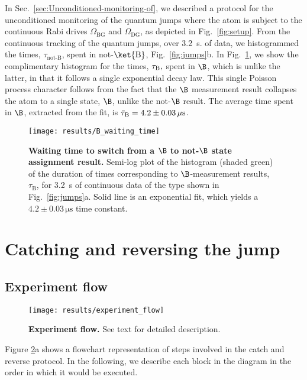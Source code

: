 In Sec.~\ref{sec:Unconditioned-monitoring-of}, we described a protocol
for the unconditioned monitoring of the quantum jumps where the atom
is subject to the continuous Rabi drives $\Omega_{\mathrm{BG}}$ and
$\Omega_{\mathrm{DG}}$, as depicted in Fig.~\ref{fig:setup}. From
the continuous tracking of the quantum jumps, over 3.2~s. of data,
we histogrammed the times, $\tau_{\operatorname{not-B}}$, spent in
not-$\ket{\mathrm{B}}$, Fig.~\ref{fig:jumps}b. In Fig.~\ref{fig:B-wait-time},
we show the complimentary histogram for the times, $\tau_{{\rm B}},$
spent in $\B$, which is unlike the latter, in that it follows a single
exponential decay law. This single Poisson process character follows
from the fact that the $\B$ measurement result collapses the atom
to a single state, $\B$, unlike the not-$\B$ result. The average
time spent in $\B$, extracted from the fit, is $\bar{\tau}_{{\rm B}}=4.2\pm0.03\,\mathrm{\mu s}$.
\begin{figure}
\centering{}\texttt{[image: results/B\_waiting\_time]}
\caption[Waiting time to switch from a $\B$ to not-$\B$ state assignment
result]{\label{fig:B-wait-time}\textbf{Waiting time to switch from a $\B$
to not-$\B$ state assignment result.} Semi-log plot of the histogram
(shaded green) of the duration of times corresponding to $\B$-measurement
results, $\tau_{\operatorname{B}}$, for 3.2~s of continuous data
of the type shown in Fig.~\ref{fig:jumps}a. Solid line is an exponential
fit, which yields a $4.2\pm0.03\,\mathrm{\mu s}$ time constant. }
\end{figure}

\pagebreak{}

\section{Catching and reversing the jump \label{sec:Catching-and-reversing}}

\subsection{Experiment flow}

\begin{figure}
\begin{centering}
\texttt{[image: results/experiment\_flow]}
\par\end{centering}
\caption[Experiment flow]{\label{fig:experiment-flow}\textbf{Experiment flow. }See text for
detailed description.}
\end{figure}
Figure \ref{fig:experiment-flow}a shows a flowchart representation
of steps involved in the catch and reverse protocol. In the following,
we describe each block in the diagram in the order in which it would
be executed.

